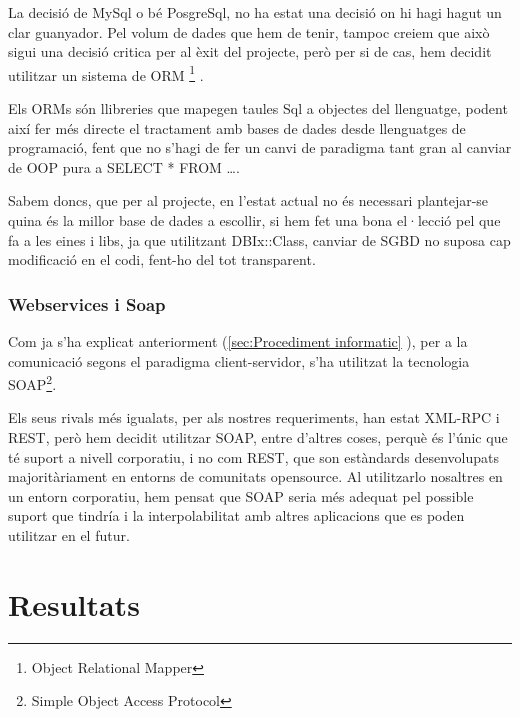 \documentclass[titlepage,a4paper,12pt]{book}
\begin{document}
La decisió de MySql o bé PosgreSql, no ha estat una decisió on hi hagi hagut un
clar guanyador.  Pel volum de dades que hem de tenir, tampoc creiem que això
sigui una decisió critica per al èxit del projecte, però per si de cas, hem
decidit utilitzar un sistema de ORM \footnote{Object Relational Mapper} .

Els ORMs són llibreries que mapegen taules Sql a objectes del llenguatge, podent
així fer més directe el tractament amb bases de dades desde llenguatges de
programació, fent que no s'hagi de fer un canvi de paradigma tant gran al
canviar de OOP pura a SELECT * FROM \ldots  .

Sabem doncs, que per al projecte, en l'estat actual no és necessari plantejar-se
quina és la millor base de dades a escollir, si hem fet una bona el·lecció pel
que fa a les eines i libs, ja que utilitzant DBIx::Class, canviar de SGBD no
suposa cap modificació en el codi, fent-ho del tot transparent.


\subsubsection{Webservices i Soap} %
\label{ssub:WS i Soap}

Com ja s'ha explicat anteriorment (\ref{sec:Procediment informatic} ), per a la
comunicació segons el paradigma client-servidor, s'ha utilitzat la tecnologia
SOAP\footnote{Simple Object Access Protocol}.

Els seus rivals més igualats, per als nostres requeriments, han estat XML-RPC i
REST, però hem decidit utilitzar SOAP, entre d'altres coses, perquè és l'únic
que té suport a nivell corporatiu, i no com REST, que son estàndards
desenvolupats majoritàriament en entorns de comunitats opensource.  Al
utilitzarlo nosaltres en un entorn corporatiu, hem pensat que SOAP seria més
adequat pel possible suport que tindría i la interpolabilitat amb altres
aplicacions que es poden utilitzar en el futur.


\section{Resultats} %
	\label{sec:Resultats}
\end{document}
